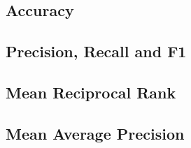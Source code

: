 \subsection{Accuracy}
\label{subsec:2_basics/4_metrics/2_accuracy}


\subsection{Precision, Recall and F1}
\label{subsec:2_basics/4_metrics/3_prf}


\subsection{Mean Reciprocal Rank}
\label{subsec:2_basics/4_metrics/4_mrr}


\subsection{Mean Average Precision}
\label{subsec:2_basics/4_metrics/5_map}

